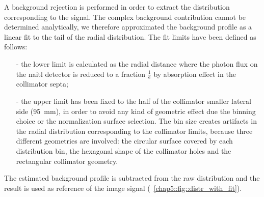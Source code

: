 A background rejection is performed in order to extract the distribution corresponding to the signal. The complex background contribution cannot be determined analytically, we therefore approximated the background profile as a linear fit to the tail of the radial distribution. The fit limits have been defined as follows:
\begin{itemize}
\item[-] the lower limit is calculated as the radial distance where the photon flux on the \gls{naitl} detector is reduced to a fraction $\mathrm{\frac{1}{e}}$ by absorption effect in the collimator septa;
\item[-] the upper limit has been fixed to the half of the collimator smaller lateral side (95~mm), in order to avoid any kind of geometric effect due the binning choice or the normalization surface selection. The bin size creates artifacts in the radial distribution corresponding to the collimator limits, because three different geometries are involved: the circular surface covered by each distribution bin, the hexagonal shape of the collimator holes and the rectangular collimator geometry.
\end{itemize}
The estimated background profile is subtracted from the raw distribution and the result is used as reference of the image signal (\figurename~\ref{chap5::fig::distr_with_fit}).

